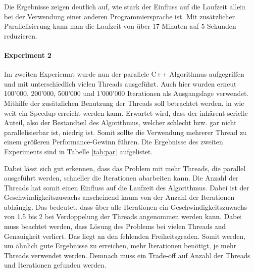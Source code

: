 \documentclass[sigconf]{acmart}
\begin{document}
Die Ergebnisse zeigen deutlich auf, wie stark der Einfluss auf die Laufzeit allein bei der Verwendung einer anderen Programmiersprache ist. Mit zusätzlicher Parallelisierung kann man die Laufzeit von über 17 Minuten auf 5 Sekunden reduzieren.

\paragraph{Experiment 2}

Im zweiten Experiemnt wurde nun der parallele C++ Algorithmus aufgegriffen und mit unterschiedlich vielen Threads ausgeführt. Auch hier wurden erneut 100'000, 200'000, 500'000 und 1'000'000 Iterationen als Ausgangslage verwendet. Mithilfe der zusätzlichen Benutzung der Threads soll betrachtet werden, in wie weit ein Speedup erreicht werden kann. Erwartet wird, dass der inhärent serielle Anteil, also der Bestandteil des Algorithmus, welcher schlecht bzw. gar nicht parallelisierbar ist, niedrig ist. Somit sollte die Verwendung mehrerer Thread zu einem größeren Performance-Gewinn führen. 
Die Ergebnisse des zweiten Experiments sind in Tabelle \ref{tab:par} aufgelistet. 


\begin{table}[htbp]
  \caption{Vergleich der des parallelen C++ Algorithmus mit unterschiedlich vielen Threads über 100'000, 200'000, 500'000 und 1'000'000 Iterationen. Alle Angaben in Sekunden.}
  \label{tab:par}
\end{table}

Dabei lässt sich gut erkennen, dass das Problem mit mehr Threads, die parallel ausgeführt werden, schneller die Iterationen abarbeiten kann. Die Anzahl der Threads hat somit einen Einfluss auf die Laufzeit des Algorithmus. Dabei ist der Geschwindigkeitszuwachs anscheinend kaum von der Anzahl der Iterationen abhängig. Das bedeutet, dass über alle Iterationen ein Geschwindigkeitszuwachs von 1.5 bis 2 bei Verdoppelung der Threads angenommen werden kann. Dabei muss beachtet werden, dass Lösung des Problems bei vielen Threads and Genauigkeit verliert. Das liegt an den fehlenden Freiheitsgraden. Somit werden, um ähnlich gute Ergebnisse zu erreichen, mehr Iterationen benötigt, je mehr Threads verwendet werden. Demnach muss ein Trade-off auf Anzahl der Threads und Iterationen gefunden werden.
\end{document}
